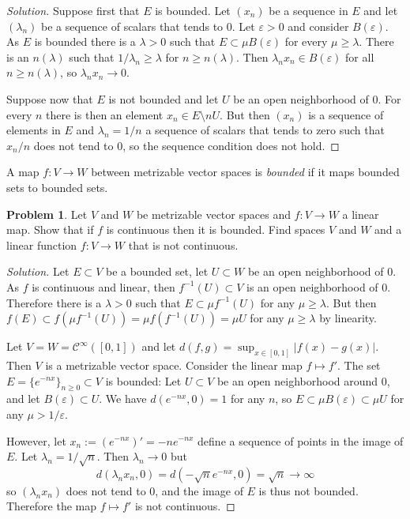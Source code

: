 \documentclass[11pt]{article}
\theoremstyle{definition}
\newtheorem{prob}{Problem}
\newcommand{\cc}[1]{\mathcal{#1}}
\begin{document}
\begin{proof}[Solution]
Suppose first that $E$ is bounded.
Let $(x_n)$ be a sequence in $E$ and let $(\lambda_n)$ be a sequence of
scalars that tends to $0$.
Let $\varepsilon > 0$ and consider $B(\varepsilon)$.
As $E$ is bounded there is a $\lambda > 0$ such that $E \subset \mu B(\varepsilon)$
for every $\mu \geq \lambda$.
There is an $n(\lambda)$ such that $1/\lambda_n \geq \lambda$ for $n \geq n(\lambda)$.
Then $\lambda_n x_n \in B(\varepsilon)$ for all $n \geq n(\lambda)$, so
$\lambda_n x_n \to 0$.

Suppose now that $E$ is not bounded and let $U$ be an open neighborhood of $0$.
For every $n$ there is then an element $x_n \in E \setminus n U$.
But then $(x_n)$ is a sequence of elements in $E$ and $\lambda_n = 1/n$ a
sequence of scalars that tends to zero such that $x_n / n$ does not tend to
$0$, so the sequence condition does not hold.
\end{proof}

A map $f : V \to W$ between metrizable vector spaces is \emph{bounded} if
it maps bounded sets to bounded sets.

\begin{prob}
Let $V$ and $W$ be metrizable vector spaces and $f : V \to W$ a linear map.
Show that if $f$ is continuous then it is bounded.
Find spaces $V$ and $W$ and a linear function $f : V \to W$ that is not continuous.
\end{prob}

\begin{proof}[Solution]
Let $E \subset V$ be a bounded set, let $U \subset W$ be an open
neighborhood of $0$.
As $f$ is continuous and linear, then $f^{-1}(U) \subset V$ is an open
neighborhood of $0$.
Therefore there is a $\lambda > 0$ such that
$E \subset \mu f^{-1}(U)$ for any $\mu \geq \lambda$.
But then $f(E) \subset f(\mu f^{-1}(U)) = \mu f(f^{-1}(U)) = \mu U$
for any $\mu \geq \lambda$
by linearity.

Let $V = W = \cc C^\infty([0,1])$ and let $d(f,g) = \sup_{x \in [0,1]}|f(x)-g(x)|$.
Then $V$ is a metrizable vector space.
Consider the linear map $f \mapsto f'$.
The set $E = \{ e^{-n x} \}_{n \geq 0} \subset V$ is bounded:
Let $U \subset V$ be an open neighborhood around $0$, and let $B(\varepsilon) \subset U$.
We have $d(e^{-nx}, 0) = 1$ for any $n$,
so $E \subset \mu B( \varepsilon ) \subset \mu U$ for any $\mu > 1 / \varepsilon$.

However, let $x_n := (e^{-nx})' = -n e^{-nx}$
define a sequence of points in the image of $E$.
Let $\lambda_n = 1/\sqrt n$.
Then $\lambda_n \to 0$ but
\[
d(\lambda_n x_n, 0) = d(-\sqrt n e^{-nx}, 0) = \sqrt n \to \infty
\]
so $(\lambda_n x_n)$ does not tend to $0$, and the image of $E$ is thus not
bounded.
Therefore the map $f \mapsto f'$ is not continuous.
\end{proof}
\end{document}
